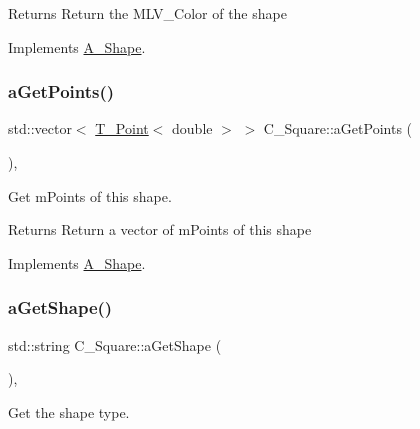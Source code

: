 \begin{DoxyReturn}{Returns}
Return the M\+L\+V\+\_\+\+Color of the shape 
\end{DoxyReturn}


Implements \hyperlink{classA__Shape_a1e90c8132d33e4ac84d42f72606193b2}{A\+\_\+\+Shape}.

\mbox{\label{classC__Square_aca738fec39149ed697f3d2413cd7cec2}} 
\subsubsection{\texorpdfstring{a\+Get\+Points()}{aGetPoints()}}
{\footnotesize\ttfamily std\+::vector$<$ \hyperlink{classT__Point}{T\+\_\+\+Point}$<$ double $>$ $>$ C\+\_\+\+Square\+::a\+Get\+Points (\begin{DoxyParamCaption}{ }\end{DoxyParamCaption})\hspace{0.3cm}{\ttfamily [override]}, {\ttfamily [virtual]}}



Get m\+Points of this shape. 

\begin{DoxyReturn}{Returns}
Return a vector of m\+Points of this shape 
\end{DoxyReturn}


Implements \hyperlink{classA__Shape_a9fd1285bd63b1fc88943c9969bf01a5c}{A\+\_\+\+Shape}.

\mbox{\label{classC__Square_a4919017d3750c1b8deb5f07d22069636}} 
\subsubsection{\texorpdfstring{a\+Get\+Shape()}{aGetShape()}}
{\footnotesize\ttfamily std\+::string C\+\_\+\+Square\+::a\+Get\+Shape (\begin{DoxyParamCaption}{ }\end{DoxyParamCaption})\hspace{0.3cm}{\ttfamily [override]}, {\ttfamily [virtual]}}



Get the shape type. 


